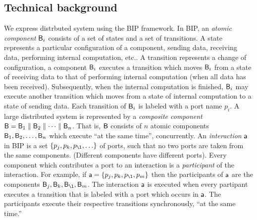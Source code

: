 

\subsection{Technical background}

We express distrbuted system using the BIP \cite{bip06,BliudzeS08} framework. In BIP, an \emph{atomic component} $\mathsf{B}_i$ consists of a set of states and a set of
transitions. A state represents a particular configuration of a component, \eg sending data, receiving data, performing internal computation, etc..
A transition represents a change of configuration, \eg a component $\mathsf{B}_i$ executes a transition which moves $\mathsf{B}_i$ from a 
state of receiving data to that of performing internal computation (\eg when all data has been received). Subsequently, when the internal computation
is finished, $\mathsf{B}_i$ may execute another transition which moves from a state of internal computation to a state of sending data.
Each transition of $\mathsf{B}_i$ is labeled with a port name $p_i$. 
A large distributed system is represented by a \emph{composite component} $\mathsf{B} = \mathsf{B}_1 \parallel \mathsf{B}_2 \parallel \cdots \parallel \mathsf{B}_n$. That is, $\mathsf{B}$ consists of $n$
atomic components $\mathsf{B}_1, \mathsf{B}_2,  \ldots,  \mathsf{B}_n$ which execute ``at the same time'', \ie concurrently. 
An \emph{interaction} $\mathsf{a}$ in BIP is a set $\{ p_j, p_k, p_{\l}, \ldots \}$ of ports, such that no two ports are taken from the same components.
(Different components have different ports). Every component which contributes a port to an interaction is a \emph{participant} of the interaction.
For example, if  $\act = \{ p_j, p_k, p_{\l}, p_m \}$ then the participants of $\mathsf{a}$ are the components $\B_j, \B_k, \B_{\l}, \B_m$.
The interaction $\mathsf{a}$ is executed when every partipant executes a transition that is labeled with a port which occurs in $\mathsf{a}$. 
The participants execute their respective transitions synchronously, \ie ``at the same time.'' 